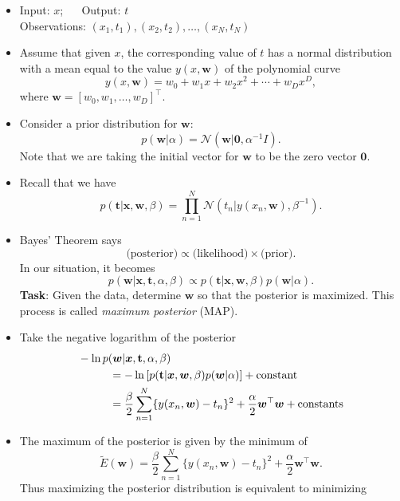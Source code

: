 \documentclass[
]{article}
\begin{document}
\begin{itemize}
\item
  Input: \(x\); ~~ Output: \(t\)\\
  Observations: \((x_1,t_1), (x_2, t_2), \dots , (x_N, t_N)\)
\item
  Assume that given \(x\), the corresponding value of \(t\) has a normal
  distribution with a mean equal to the value \(y(x, {\boldsymbol{w}})\)
  of the polynomial curve
  \[ y(x,{\boldsymbol{w}}) = w_0 +w_1 x + w_2 x^2 + \cdots + w_D x^D ,\]
  where \({\boldsymbol{w}}=[w_0, w_1, \dots , w_D]^\top\).
\item
  Consider a prior distribution for \({\boldsymbol{w}}\):
  \[ p({\boldsymbol{w}}|\alpha) = \mathcal N({\boldsymbol{w}}| \pmb{0}, \alpha^{-1} I) . \]
  Note that we are taking the initial vector for \({\boldsymbol{w}}\) to
  be the zero vector \(\pmb{0}\).
\item
  Recall that we have
  \[ p(\mathbf{t}|{\boldsymbol{x}}, {\boldsymbol{w}}, \beta) = \prod_{n=1}^N \mathcal N(t_n|y(x_n, {\boldsymbol{w}}), \beta^{-1}). \]
\item
  Bayes' Theorem says
  \[ \text{(posterior)} \propto \text{(likelihood)} \times \text{(prior)} .\]
  In our situation, it becomes
  \[ p({\boldsymbol{w}}| {\boldsymbol{x}}, \mathbf{t}, \alpha, \beta) \propto p(\mathbf{t}|{\boldsymbol{x}}, {\boldsymbol{w}}, \beta) p({\boldsymbol{w}}| \alpha) .\]
  \textbf{Task}: Given the data, determine \({\boldsymbol{w}}\) so that
  the posterior is maximized. This process is called \emph{maximum
  posterior} (MAP).
\item
  Take the negative logarithm of the posterior
  \begin{align*} & - \ln p({\boldsymbol{w}}| {\boldsymbol{x}}, \mathbf{t}, \alpha, \beta)  \\ & \hskip 1 cm  = - \ln \left [  p(\mathbf{t}|{\boldsymbol{x}}, {\boldsymbol{w}}, \beta) p({\boldsymbol{w}}| \alpha) \right ]  + \text{constant} \\ &\hskip 1 cm =   
  \frac \beta 2 \sum_{n=1}^N \{ y(x_n, {\boldsymbol{w}})-t_n \}^2 + \frac \alpha 2 {\boldsymbol{w}}^\top {\boldsymbol{w}}+ \text{constants} 
  \end{align*}
\item
  The maximum of the posterior is given by the minimum of
  \[ \tilde E({\boldsymbol{w}}) = \frac \beta 2 \sum_{n=1}^N \{ y(x_n, {\boldsymbol{w}})-t_n \}^2 + \frac \alpha 2 {\boldsymbol{w}}^\top {\boldsymbol{w}}.  \]
  Thus maximizing the posterior distribution is equivalent to minimizing

\end{itemize}
\end{document}
